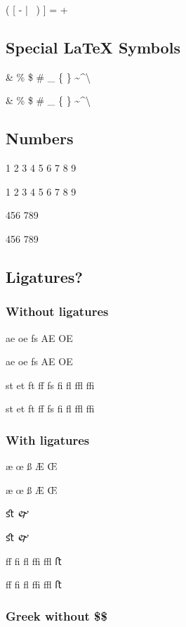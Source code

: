 \documentclass[a4paper,10pt]{article}
\begin{document}
{\Fontify ( [ - | \ ) ] = +}


\subsection{Special LaTeX Symbols}

{\Reference \& \% \$ \# \_ \{ \} \textasciitilde \textasciicircum \textbackslash}

{\Fontify \& \% \$ \# \_ \{ \} \textasciitilde \textasciicircum \textbackslash}


\subsection{Numbers}

{ 1 2 3 4 5 6 7 8 9}

{ 1 2 3 4 5 6 7 8 9}


{ 456 789}

{ 456 789}


{}

{}


\subsection{Ligatures?}

\subsubsection{Without ligatures}

{\Reference ae oe fs AE OE}

{\Fontify ae oe fs AE OE}


{\Reference st et ft ff fs fi fl ffl ffi}

{\Fontify st et ft ff fs fi fl ffl ffi}


\subsubsection{With ligatures}

{\Reference æ œ ß Æ Œ}

{\Fontify æ œ ß Æ Œ}


{\Reference ﬆ 🙰}

{\Fontify ﬆ 🙰}


{\Reference ﬀ ﬁ ﬂ ﬃ ﬄ ﬅ}

{\Fontify ﬀ ﬁ ﬂ ﬃ ﬄ ﬅ}


\subsubsection{Greek without \$\$}
\end{document}
